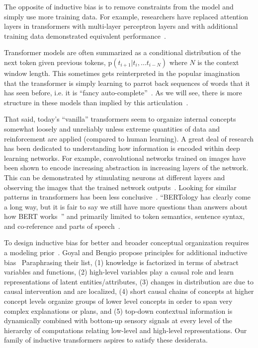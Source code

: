 \documentclass{article}
\begin{document}
The opposite of inductive bias is to remove constraints from the model and simply use more training data. For example, researchers have replaced attention layers in transformers with multi-layer perceptron layers and with additional training data demonstrated equivalent performance~\citep{liu2021pay}.

Transformer models are often summarized as a conditional distribution of the next token given previous tokens, p$(t_{i+1} | t_i, \ldots t_{i-N})$ where $N$ is the context window length. This sometimes gets reinterpreted in the popular imagination that the transformer is simply learning to parrot back sequences of words that it has seen before, i.e. it is ``fancy auto-complete''~\citep{marcus2023sentence}.  As we will see, there is more structure in these models than implied by this articulation~\citep{veres2022large}. %

That said, today's ``vanilla'' transformers seem to organize internal concepts somewhat loosely and unreliably unless extreme quantities of data and reinforcement are applied (compared to human learning). A great deal of research has been dedicated to understanding how information is encoded within deep learning networks. For example, convolutional networks trained on images have been shown to encode increasing abstraction in increasing layers of the network.  This can be demonstrated by stimulating neurons at different layers and observing the images that the trained network outputs~\citep{doi:10.1073/pnas.1907375117}.  Looking for similar patterns in transformers has been less conclusive~\citep{clark-etal-2019-bert}. ``BERTology has clearly come a long way, but it is fair to say we still have more questions than answers about how BERT works~\citep{rogers2020primer}'' and primarily limited to token semantics, sentence syntax, and co-reference and parts of speech~\cite{clark-etal-2019-bert}.

To design inductive bias for better and broader conceptual organization requires a modeling prior~\citep{frankle2019lottery}.  Goyal and Bengio propose principles for additional inductive bias~\citep{goyal2022inductive} Paraphrasing their list, (1) knowledge is factorized in terms of abstract variables and functions, (2) high-level variables play a causal role and learn representations of latent entities/attributes, (3) changes in distribution are due to causal intervention and are localized, (4) short causal chains of concepts at higher concept levels organize groups of lower level concepts in order to span very complex explanations or plans, and (5) top-down contextual information is dynamically combined with bottom-up sensory signals at every level of the hierarchy of computations relating low-level and high-level representations.  Our family of inductive transformers aspires to satisfy these desiderata.
\end{document}
